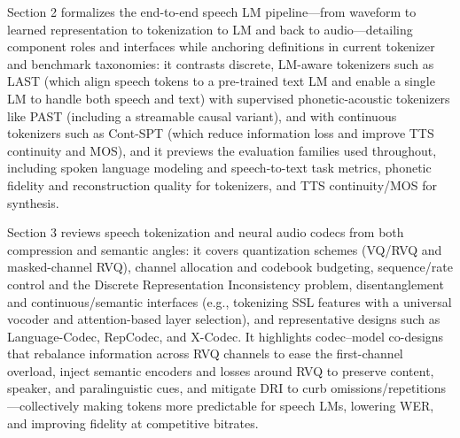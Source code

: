 \documentclass{article}
\begin{document}
Section 2 formalizes the end-to-end speech LM pipeline---from waveform to learned representation to tokenization to LM and back to audio---detailing component roles and interfaces while anchoring definitions in current tokenizer and benchmark taxonomies: it contrasts discrete, LM-aware tokenizers such as LAST (which align speech tokens to a pre-trained text LM and enable a single LM to handle both speech and text) with supervised phonetic-acoustic tokenizers like PAST (including a streamable causal variant), and with continuous tokenizers such as Cont-SPT (which reduce information loss and improve TTS continuity and MOS), and it previews the evaluation families used throughout, including spoken language modeling and speech-to-text task metrics, phonetic fidelity and reconstruction quality for tokenizers, and TTS continuity/MOS for synthesis. \cite{li2025continuousspeechtokenizertext,har-tuv2025pastphoneticacousticspeechtokenizer,turetzky2024lastlanguagemodelawarespeechtokenization} 



Section 3 reviews speech tokenization and neural audio codecs from both compression and semantic angles: it covers quantization schemes (VQ/RVQ and masked-channel RVQ), channel allocation and codebook budgeting, sequence/rate control and the Discrete Representation Inconsistency problem, disentanglement and continuous/semantic interfaces (e.g., tokenizing SSL features with a universal vocoder and attention-based layer selection), and representative designs such as Language-Codec, RepCodec, and X-Codec. It highlights codec--model co-designs that rebalance information across RVQ channels to ease the first-channel overload, inject semantic encoders and losses around RVQ to preserve content, speaker, and paralinguistic cues, and mitigate DRI to curb omissions/repetitions---collectively making tokens more predictable for speech LMs, lowering WER, and improving fidelity at competitive bitrates. \cite{liu2024analyzingmitigatinginconsistencydiscrete,ye2024codecdoesmatterexploringsemanticshortcom,ji2025languagecodecbridgingdiscreterepresentat,huang2024repcodecspeechrepresentationcodectokeniz,mousavi2024howshouldweextractdiscreteaudiotokenssel} 
\end{document}
